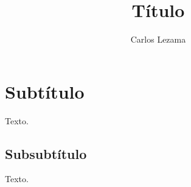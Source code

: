 \documentclass[ba]{imsart}
\numberwithin{equation}{section}
\theoremstyle{plain}
\begin{document}
\begin{frontmatter}

\title{Título}

\begin{aug}
\author{Carlos Lezama}

\address[addr1]{Historia Económica de México (ECO 17100), ITAM,  \ifstrequal{addr1}{addr1}{}{}
}%


\end{aug}

\begin{abstract}

\end{abstract}



\end{frontmatter}

\hypertarget{subtuxedtulo}{%
\section{Subtítulo}\label{subtuxedtulo}}

Texto.

\hypertarget{subsubtuxedtulo}{%
\subsection{Subsubtítulo}\label{subsubtuxedtulo}}

Texto.





\end{document}
